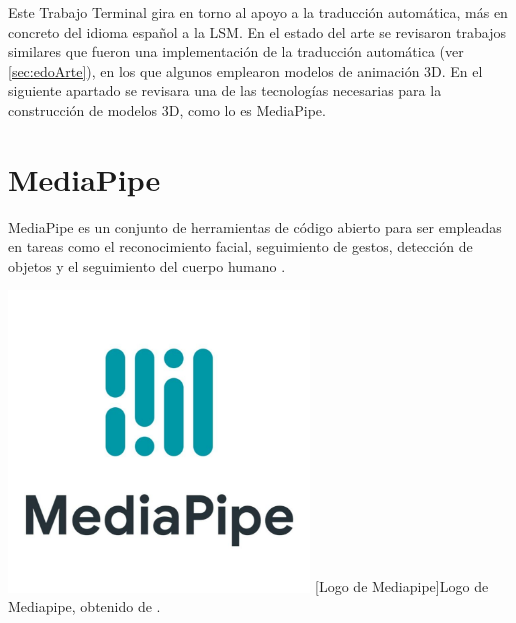 Este Trabajo Terminal gira en torno al apoyo a la traducción automática, más en concreto del idioma español a la LSM. En el estado del arte se revisaron trabajos similares que fueron una implementación de la traducción automática (ver \autoref{sec:edoArte}), en los que algunos emplearon modelos de animación 3D. En el siguiente apartado se revisara una de las tecnologías necesarias para la construcción de modelos 3D, como lo es MediaPipe.\\

\section{MediaPipe}
MediaPipe es un conjunto de herramientas de código abierto para ser empleadas en tareas como el reconocimiento facial, seguimiento de gestos, detección de objetos y el seguimiento del cuerpo humano \cite{ref49}.

\begin{center}
    \includegraphics[width=0.6\textwidth]{Images/Cap 2/MediaPipeLogo.jpeg}
    [Logo de Mediapipe]{Logo de Mediapipe, obtenido de \cite{ref50}.} 
\end{center}

\newpage
